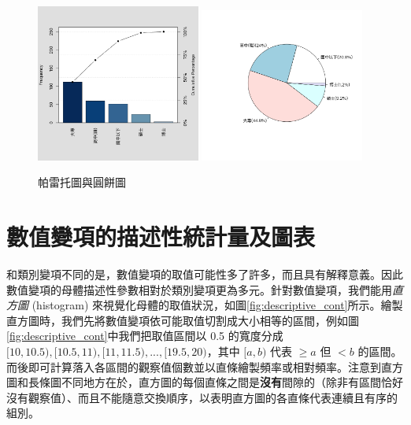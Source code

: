     \begin{figure}[htbp]
      \centering
      \includegraphics[width=0.48\textwidth]{figures/02-Descriptive_statistics/pareto_chart.png}
      \includegraphics[width=0.48\textwidth]{figures/02-Descriptive_statistics/pie_chart.png}
      \caption{帕雷托圖與圓餅圖}
      \label{fig:pareto_chart_pie_chart}
    \end{figure}
    

\section{數值變項的描述性統計量及圖表}
    和類別變項不同的是，數值變項的取值可能性多了許多，而且具有解釋意義。因此數值變項的母體描述性參數相對於類別變項更為多元。針對數值變項，我們能用\textit{直方圖} (histogram) 來視覺化母體的取值狀況，如圖\ref{fig:descriptive_cont}所示。繪製直方圖時，我們先將數值變項依可能取值切割成大小相等的區間，例如圖\ref{fig:descriptive_cont}中我們把取值區間以 0.5 的寬度分成$[10,10.5),[10.5,11),[11,11.5),...,[19.5,20)$，其中 $[a,b)$ 代表 $\ge a$ 但 $<b$ 的區間。而後即可計算落入各區間的觀察值個數並以直條繪製頻率或相對頻率。注意到直方圖和長條圖不同地方在於，直方圖的每個直條之間是\textbf{沒有}間隙的（除非有區間恰好沒有觀察值）、而且不能隨意交換順序，以表明直方圖的各直條代表連續且有序的組別。

